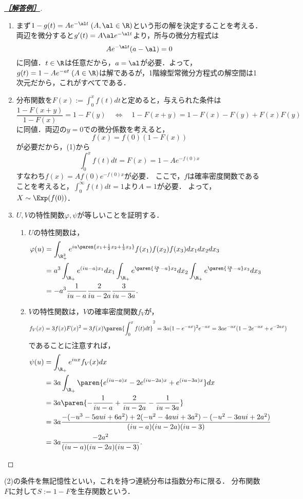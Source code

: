\documentclass[uplatex,dvipdfmx]{jsarticle}
\begin{document}
\begin{proof}[\textbf{\underline{［解答例］}}]\mbox{}
    \begin{enumerate}
        \item まず$1-g(t)=Ae^{-\al t}\;(A,\al\in\R)$という形の解を決定することを考える．
        両辺を微分すると$g'(t)=A\al e^{-\al t}$より，所与の微分方程式は
        \[Ae^{-\al t}(a-\al)=0\]
        に同値．$t\in\R$は任意だから，$a=\al$が必要．よって，$g(t)=1-Ae^{-at}\;(A\in\R)$は解であるが，1階線型常微分方程式の解空間は1次元だから，これがすべてである．
        \item 分布関数を$F(x):=\int^x_0f(t)dt$と定めると，与えられた条件は
        \[\frac{1-F(x+y)}{1-F(x)}=1-F(y)\quad\Leftrightarrow\quad 1-F(x+y)=1-F(x)-F(y)+F(x)F(y)\]
        に同値．両辺の$y=0$での微分係数を考えると，
        \[f(x)=f(0)(1-F(x))\]
        が必要だから，(1)から
        \[\int^x_0f(t)dt=F(x)=1-Ae^{-f(0)x}\]
        すなわち$f(x)=Af(0) e^{-f(0) x}$が必要．
        ここで，$f$は確率密度関数であることを考えると，$\int_0^\infty f(t)dt=1$より$A=1$が必要．
        よって，$X\sim\Exp(f(0))$．
        \item $U,V$の特性関数$\varphi,\psi$が等しいことを証明する．
        \begin{enumerate}
            \item $U$の特性関数は，
            \begin{align*}
                \varphi(u)&=\int_{\R_+^3}e^{iu\paren{x_1+\frac{1}{2}x_2+\frac{1}{3}x_3}}f(x_1)f(x_2)f(x_3)dx_1dx_2dx_3\\
                &=a^3\int_{\R_+}e^{(iu-a)x_1}dx_1\int_{\R_+}e^{\paren{\frac{iu}{2}-a}x_2}dx_2\int_{\R_+}e^{\paren{\frac{iu}{3}-a}x_3}dx_3\\
                &=-a^3\frac{1}{iu-a}\frac{2}{iu-2a}\frac{3}{iu-3a}.
            \end{align*}
            \item $V$の特性関数は，$V$の確率密度関数$f_V$が，\[f_V(x)=3f(x)F(x)^2=3f(x)\paren{\int_0^xf(t)dt}^2=3a(1-e^{-ax})^2e^{-ax}=3ae^{-ax}(1-2e^{-ax}+e^{-2ax})\]
            であることに注意すれば，
            \begin{align*}
                \psi(u)&=\int_{\R_+}e^{iux}f_V(x)dx\\
                &=3a\int_{\R_+}\paren{e^{(iu-a)x}-2e^{(iu-2a)x}+e^{(iu-3a)x}}dx\\
                &=3a\paren{-\frac{1}{iu-a}+\frac{2}{iu-2a}-\frac{1}{iu-3a}}\\
                &=3a\frac{-(-u^3-5aui+6a^2)+2(-u^2-4aui+3a^2)-(-u^2-3aui+2a^2)}{(iu-a)(iu-2a)(iu-3)}\\
                &=3a\frac{-2a^2}{(iu-a)(iu-2a)(iu-3)}.
            \end{align*}
        \end{enumerate}
    \end{enumerate}
\end{proof}
\begin{remarks*}[無記憶性による指数分布の特徴付け]
    (2)の条件を無記憶性といい，これを持つ連続分布は指数分布に限る．
    分布関数$F$に対して$S:=1-F$を生存関数という．
\end{remarks*}
\end{document}
